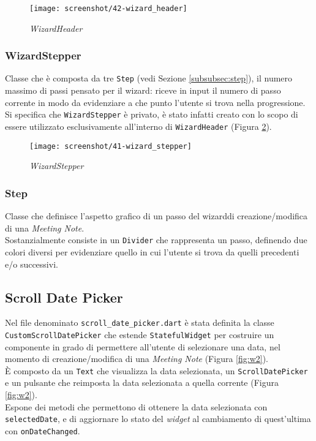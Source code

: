 \begin{figure}[!h] 
    \centering 
    \texttt{[image: screenshot/42-wizard\_header]} 
    \caption{\emph{WizardHeader}}
    \label{fig:wizard-header}
\end{figure}

\subsubsection*{WizardStepper}
\label{subsubsec:wizard-stepper}

Classe che è composta da tre \lstinline{Step} (vedi Sezione \ref{subsubsec:step}), il numero massimo di passi pensato per il \gls{wizard}\glsoccur: riceve in input il numero di passo corrente in modo da evidenziare a che punto l'utente si trova nella progressione.
Si specifica che \lstinline{WizardStepper} è privato, è stato infatti creato con lo scopo di essere utilizzato esclusivamente all'interno di \lstinline{WizardHeader} (Figura \ref{fig:wizard-stepper}).\\

\begin{figure}[!h] 
    \centering 
    \texttt{[image: screenshot/41-wizard\_stepper]} 
    \caption{\emph{WizardStepper}}
    \label{fig:wizard-stepper}
\end{figure}

\subsubsection*{Step}
\label{subsubsec:step}

Classe che definisce l'aspetto grafico di un passo del \gls{wizard}\glsoccur di creazione/modifica di una \emph{Meeting Note}.\\
Sostanzialmente consiste in un \lstinline{Divider} \cite{site:divider} che rappresenta un passo, definendo due colori diversi per evidenziare quello in cui l'utente si trova da quelli precedenti e/o successivi.

\subsection{Scroll Date Picker}
\label{subsec:scroll-date-picker}

Nel file denominato \lstinline{scroll_date_picker.dart} è stata definita la classe \lstinline{CustomScrollDatePicker} che estende \lstinline{StatefulWidget} per costruire un componente in grado di permettere all'utente di selezionare una data, nel momento di creazione/modifica di una \emph{Meeting Note} (Figura \ref{fig:w2}).\\
È composto da un \lstinline{Text} \cite{site:text} che visualizza la data selezionata, un \lstinline{ScrollDatePicker} \cite{site:scroll-date-picker} e un pulsante che reimposta la data selezionata a quella corrente (Figura \ref{fig:w2}).\\
Espone dei metodi che permettono di ottenere la data selezionata con \lstinline{selectedDate}, e di aggiornare lo stato del \emph{widget} al cambiamento di quest'ultima con \lstinline{onDateChanged}.

